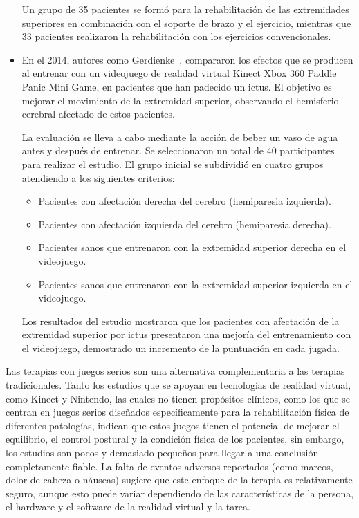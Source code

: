 \begin{itemize}
    Un grupo de 35 pacientes se formó para la rehabilitación de las extremidades superiores en combinación con el soporte de brazo y el ejercicio, mientras que 33 pacientes realizaron la rehabilitación con los ejercicios convencionales.
    
    \item En el 2014, autores como Gerdienke~\cite{10.3233/NRE-141105}, compararon los efectos que se producen al entrenar con un videojuego de realidad virtual Kinect Xbox 360 Paddle Panic Mini Game, en pacientes que han padecido un ictus. El objetivo es mejorar el movimiento de la extremidad superior, observando el hemisferio cerebral afectado de estos pacientes.

    La evaluación se lleva a cabo mediante la acción de beber un vaso de agua antes y después de entrenar. Se seleccionaron un total de 40 participantes para realizar el estudio. El grupo inicial se subdividió en cuatro grupos atendiendo a los siguientes criterios:

    \begin{itemize}
        \item Pacientes con afectación derecha del cerebro (hemiparesia izquierda).
        \item Pacientes con afectación izquierda del cerebro (hemiparesia derecha).
        \item Pacientes sanos que entrenaron con la extremidad superior derecha en el videojuego.
        \item Pacientes sanos que entrenaron con la extremidad superior izquierda en el videojuego.
    \end{itemize}

    Los resultados del estudio mostraron que los pacientes con afectación de la extremidad superior por ictus presentaron una mejoría del entrenamiento con el videojuego, demostrado un incremento de la puntuación en cada jugada.
\end{itemize}

Las terapias con juegos serios son una alternativa complementaria a las terapias tradicionales. Tanto los estudios que se apoyan en tecnologías de realidad virtual, como Kinect y Nintendo, las cuales no tienen propósitos clínicos, como los que se centran en juegos serios diseñados específicamente para la rehabilitación física de diferentes patologías, indican que estos juegos tienen el potencial de mejorar el equilibrio, el control postural y la condición física de los pacientes, sin embargo, los estudios son pocos y demasiado pequeños para llegar a una conclusión completamente fiable. La falta de eventos adversos reportados (como mareos, dolor de cabeza o náuseas) sugiere que este enfoque de la terapia es relativamente seguro, aunque esto puede variar dependiendo de las características de la persona, el hardware y el software de la realidad virtual y la tarea. 